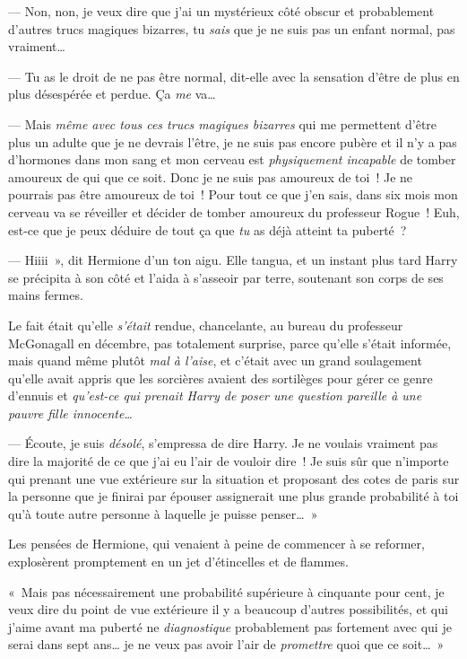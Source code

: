 --- Non, non, je veux dire que j'ai un mystérieux côté obscur et probablement d'autres trucs magiques bizarres, tu \emph{sais} que je ne suis pas un enfant normal, pas vraiment…

--- Tu as le droit de ne pas être normal, dit-elle avec la sensation d'être de plus en plus désespérée et perdue. Ça \emph{me} va…

--- Mais \emph{même avec tous ces trucs magiques bizarres} qui me permettent d'être plus un adulte que je ne devrais l'être, je ne suis pas encore pubère et il n'y a pas d'hormones dans mon sang et mon cerveau est \emph{physiquement incapable} de tomber amoureux de qui que ce soit. Donc je ne suis pas amoureux de toi~! Je ne pourrais pas être amoureux de toi~! Pour tout ce que j'en sais, dans six mois mon cerveau va se réveiller et décider de tomber amoureux du professeur Rogue~! Euh, est-ce que je peux déduire de tout ça que \emph{tu} as déjà atteint ta puberté~?

--- Hiiii~», dit Hermione d'un ton aigu. Elle tangua, et un instant plus tard Harry se précipita à son côté et l'aida à s'asseoir par terre, soutenant son corps de ses mains fermes.

Le fait était qu'elle \emph{s'était} rendue, chancelante, au bureau du professeur McGonagall en décembre, pas totalement surprise, parce qu'elle s'était informée, mais quand même plutôt \emph{mal à l'aise}, et c'était avec un grand soulagement qu'elle avait appris que les sorcières avaient des sortilèges pour gérer ce genre d'ennuis et \emph{qu'est-ce qui prenait Harry de poser une question pareille à une pauvre fille innocente…}

--- Écoute, je suis \emph{désolé}, s'empressa de dire Harry. Je ne voulais vraiment pas dire la majorité de ce que j'ai eu l'air de vouloir dire~! Je suis sûr que n'importe qui prenant une vue extérieure sur la situation et proposant des cotes de paris sur la personne que je finirai par épouser assignerait une plus grande probabilité à toi qu'à toute autre personne à laquelle je puisse penser…~»

Les pensées de Hermione, qui venaient à peine de commencer à se reformer, explosèrent promptement en un jet d'étincelles et de flammes.

«~Mais pas nécessairement une probabilité supérieure à cinquante pour cent, je veux dire du point de vue extérieure il y a beaucoup d'autres possibilités, et qui j'aime avant ma puberté ne \emph{diagnostique} probablement pas fortement avec qui je serai dans sept ans… je ne veux pas avoir l'air de \emph{promettre} quoi que ce soit…~»

